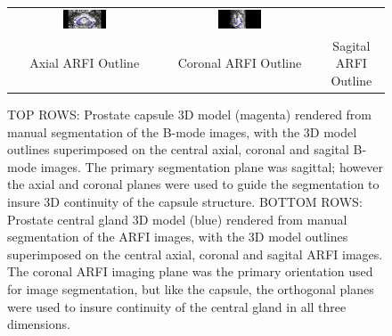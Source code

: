 \begin{figure}[htb!]
\begin{tabular}{ccc}
\includegraphics[width=0.3\textwidth]{zach/CG_Modeling_Images/Coronal_CG.png} &
\includegraphics[width=0.3\textwidth]{zach/CG_Modeling_Images/Sagittal_CG.png} \\
Axial ARFI Outline & Coronal ARFI Outline & Sagital ARFI Outline \\
\end{tabular}
\caption{TOP ROWS: Prostate capsule 3D model (magenta) rendered from manual
    segmentation of the B-mode images, with the 3D model outlines superimposed
    on the central axial, coronal and sagital B-mode images.  The primary
    segmentation plane was sagittal; however the axial and coronal planes were
    used to guide the segmentation to insure 3D continuity of the capsule
    structure.  BOTTOM ROWS: Prostate central gland 3D model (blue) rendered
    from manual segmentation of the ARFI images, with the 3D model outlines
    superimposed on the central axial, coronal and sagital ARFI images.  The
    coronal ARFI imaging plane was the primary orientation used for image
    segmentation, but like the capsule, the orthogonal planes were used to
    insure continuity of the central gland in all three dimensions.}
\label{fig:arfi_segs} 
\end{figure}
